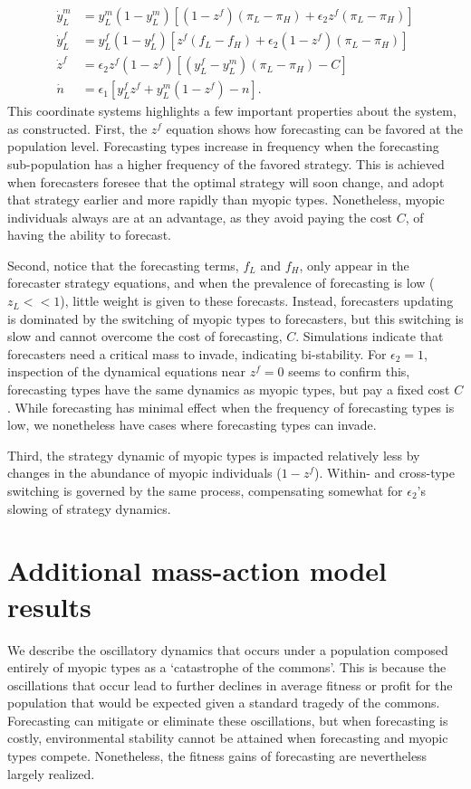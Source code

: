 \documentclass{article}
\begin{document}
\begin{align}
    \dot{y}_L^m &= y_L^m\left(1-y_L^m\right)\left[(1-z^f)(\pi_L-\pi_H)+\epsilon_2 z^f (\pi_L-\pi_H)\right]\\
    \dot{y}_L^f &= y_L^f\left(1-y_L^f\right)\left[z^f(f_L-f_H)+\epsilon_2(1-z^f)(\pi_L-\pi_H)\right]\\
    \dot{z}^f &= \epsilon_2 z^f (1-z^f) \left[(y_L^f-y_L^m)(\pi_L-\pi_H)-C\right]\\
    \dot{n}_{~} &= \epsilon_1 \left[y_L^f z^f+y_L^m(1-z^f)-n\right].
\end{align}
This coordinate systems highlights a few important properties about the system, as constructed. First, the $z^f$ equation shows how forecasting can be favored at the population level. Forecasting types increase in frequency when the forecasting sub-population has a higher frequency of the favored strategy. This is achieved when forecasters foresee that the optimal strategy will soon change, and adopt that strategy earlier and more rapidly than myopic types. Nonetheless, myopic individuals always are at an advantage, as they avoid paying the cost $C$, of having the ability to forecast. 

Second, notice that the forecasting terms, $f_L$ and $f_H$, only appear in the forecaster strategy equations, and when the prevalence of forecasting is low ($z_L<<1$), little weight is given to these forecasts. Instead, forecasters updating is dominated by the switching of myopic types to forecasters, but this switching is slow and cannot overcome the cost of forecasting, $C$. Simulations indicate that forecasters need a critical mass to invade, indicating bi-stability. For $\epsilon_2=1$, inspection of the dynamical equations near $z^f=0$ seems to confirm this, forecasting types have the same dynamics as myopic types, but pay a fixed cost $C$. While forecasting has minimal effect when the frequency of forecasting types is low, we nonetheless have cases where forecasting types can invade. 

Third, the strategy dynamic of myopic types is impacted relatively less by changes in the abundance of myopic individuals ($1-z^f$). Within- and cross-type switching is governed by the same process, compensating somewhat for $\epsilon_2$'s slowing of strategy dynamics.

\section{Additional mass-action model results}
We describe the oscillatory dynamics that occurs under a population composed entirely of myopic types as a `catastrophe of the commons'. This is because the oscillations that occur lead to further declines in average fitness or profit for the population that would be expected given a standard tragedy of the commons. Forecasting can mitigate or eliminate these oscillations, but when forecasting is costly, environmental stability cannot be attained when forecasting and myopic types compete. Nonetheless, the fitness gains of forecasting are nevertheless largely realized. 
\end{document}
